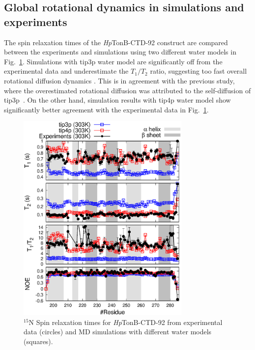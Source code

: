 \documentclass[journal=jpcbfk,manuscript=article]{achemso}
\begin{document}
\subsection{Global rotational dynamics in simulations and experiments}
The spin relaxation times of the {\it Hp}TonB-CTD-92 construct are compared 
between the experiments and simulations using two
different water models in Fig.~\ref{HpTonBrelaxationDATA}.
Simulations with tip3p water model are significantly
off from the experimental data and underestimate the $T_1/T_2$ ratio, suggesting too
fast overall rotational diffusion dynamics \cite{carper97}.
This is in agreement with the previous study, where the overestimated
rotational diffusion was attributed to the self-diffusion of tip3p~\cite{wong08}.
On the other hand, simulation results with tip4p water model show significantly
better agreement with the experimental data in  Fig.~\ref{HpTonBrelaxationDATA}.
\begin{figure}[!h]
  \includegraphics[width=8.5cm]{../Figs/HpTonBrelaxationDATA.eps}%
  \caption{$^{15}$N Spin relaxation times for {\it Hp}TonB-CTD-92 from experimental data (circles)
    and MD simulations with different water models (squares).
    \label{HpTonBrelaxationDATA}}%
\end{figure}
\end{document}
